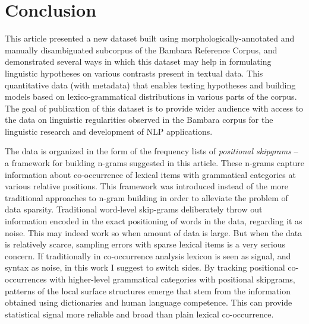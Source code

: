 \documentclass[12pt]{article}
\begin{document}


\section{Conclusion}

This article presented a new dataset built using
morphologically-annotated and manually disambiguated subcorpus of the
Bambara Reference Corpus, and demonstrated several ways in which this
dataset may help in formulating linguistic hypotheses on various
contrasts present in textual data. This quantitative data (with
metadata) that enables testing hypotheses and building models based on
lexico-grammatical distributions in various parts of the corpus.  The
goal of publication of this dataset is to provide wider audience with
access to the data on linguistic regularities observed in the Bambara
corpus for the linguistic research and development of NLP
applications.

The data is organized in the form of the frequency lists of
\textit{positional skipgrams} -- a framework for building n-grams
suggested in this article. These n-grams capture information about
co-occurrence of lexical items with grammatical categories at various
relative positions. This framework was introduced instead of the more
traditional approaches to n-gram building in order to alleviate the
problem of data sparsity. Traditional word-level skip-grams
deliberately throw out information encoded in the exact positioning of
words in the data, regarding it as noise. This may indeed work so when
amount of data is large. But when the data is relatively scarce,
sampling errors with sparse lexical items is a very serious
concern. If traditionally in co-occurrence analysis lexicon is seen as
signal, and syntax as noise, in this work I suggest to switch
sides. By tracking positional co-occurrences with higher-level
grammatical categories with positional skipgrams, patterns of the
local surface structures emerge that stem from the information
obtained using dictionaries and human language competence. This can
provide statistical signal more reliable and broad than plain lexical
co-occurrence. 
\end{document}
